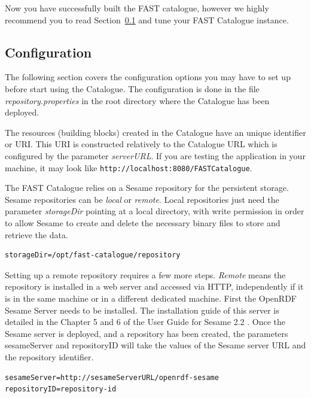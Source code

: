 \documentclass{fast_latex}
\begin{document}
Now you have successfully built the FAST catalogue, however we highly recommend you to read Section~\ref{sub:configuration} and tune your FAST Catalogue instance.


\subsection{Configuration} %
\label{sub:configuration}

The following section covers the configuration options you may have to set up before start using the Catalogue. The configuration is done in the file \emph{repository.properties} in the root directory where the Catalogue has been deployed.

The resources (building blocks) created in the Catalogue have an unique identifier or URI. This URI is constructed relatively to the Catalogue URL which is configured by the parameter \emph{serverURL}. If you are testing the application in your machine, it may look like \verb|http://localhost:8080/FASTCatalogue|.

The FAST Catalogue relies on a Sesame repository for the persistent storage. Sesame repositories can be \emph{local} or \emph{remote}. Local repositories just need the parameter \emph{storageDir} pointing at a local directory, with write permission in order to allow Sesame to create and delete the necessary binary files to store and retrieve the data.

\begin{verbatim}
storageDir=/opt/fast-catalogue/repository
\end{verbatim}

Setting up a remote repository requires a few more steps. \emph{Remote} means the repository is installed in a web server and accessed via HTTP, independently if it is in the same machine or in a different dedicated machine. First the OpenRDF Sesame Server needs to be installed. The installation guide of this server is detailed in the Chapter 5 and 6 of the User Guide for Sesame 2.2 \cite{sesame2.2}. Once the Sesame server is deployed, and a repository has been created, the parameters sesameServer and repositoryID will take the values of the Sesame server URL and the repository identifier.

\begin{verbatim}
sesameServer=http://sesameServerURL/openrdf-sesame
repositoryID=repository-id
\end{verbatim}
\end{document}
